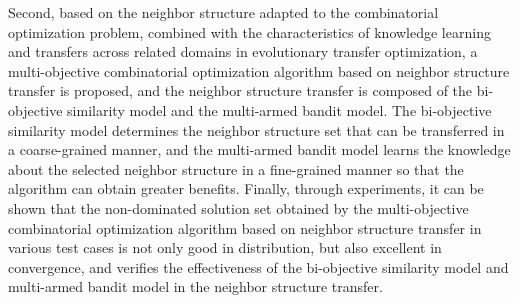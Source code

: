 \begin{abstractEn}
        Second, based on the neighbor structure adapted to the combinatorial optimization problem, combined with the characteristics of knowledge learning and transfers across related domains in evolutionary transfer optimization, a multi-objective combinatorial optimization algorithm based on neighbor structure transfer is proposed, and the neighbor structure transfer is composed of the bi-objective similarity model and the multi-armed bandit model. The bi-objective similarity model determines the neighbor structure set that can be transferred in a coarse-grained manner, and the multi-armed bandit model learns the knowledge about the selected neighbor structure in a fine-grained manner so that the algorithm can obtain greater benefits. Finally, through experiments, it can be shown that the non-dominated solution set obtained by the multi-objective combinatorial optimization algorithm based on neighbor structure transfer in various test cases is not only good in distribution, but also excellent in convergence, and verifies the effectiveness of the bi-objective similarity model and multi-armed bandit model in the neighbor structure transfer.
    \end{abstractEn}
